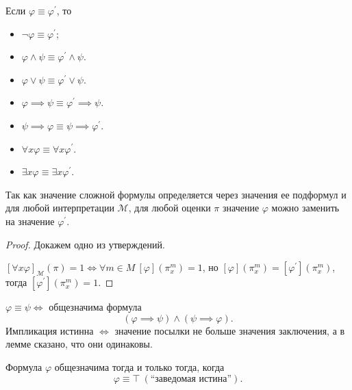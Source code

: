\documentclass[a4paper, fleqn]{article}
\begin{document}
    \begin{lemma}
        Если $\varphi \equiv \varphi^{\prime}$, то
        \begin{itemize}[topsep=0pt]
            \item $\neg \varphi \equiv \varphi^{\prime}$;
            \item $\varphi \land \psi \equiv \varphi^{\prime} \land \psi$.
            \item $\varphi \lor \psi \equiv \varphi^{\prime} \lor \psi$.
            \item $\varphi \implies \psi \equiv \varphi^{\prime} \implies \psi$.
            \item $\psi \implies \varphi \equiv \psi \implies \varphi^{\prime}$.
            \item $\forall x \varphi \equiv \forall x \varphi^{\prime}$.
            \item $\exists x \varphi \equiv \exists x \varphi^{\prime}$.
        \end{itemize}
        Так как значение сложной формулы определяется через значения ее подформул и 
        для любой интерпретации $\mathcal{M}$, для любой оценки $\pi$ значение 
        $\varphi$ можно заменить на значение $\varphi^{\prime}$.
    \end{lemma}

    \begin{proof}
        Докажем одно из утверждений. 

        $[\forall x \varphi]_{\mathcal{M}}(\pi) = 1 
        \iff \forall m \in M~[\varphi]\left( \pi_{x}^{m} \right) = 1$, 
        но $[\varphi]\left( \pi_{x}^{m} \right) = 
        [\varphi^{\prime}]\left( \pi_{x}^{m} \right)$, тогда 
        $[\varphi^{\prime}]\left( \pi_{x}^{m} \right) = 1$.
    \end{proof}

    \begin{lemma}
        $\varphi \equiv \psi \iff $ общезначима формула
        $$
            (\varphi \implies \psi) \land (\psi \implies \varphi).
        $$
        Импликация истинна $\iff$ значение посылки не больше значения заключения, 
        а в лемме сказано, что они одинаковы.
    \end{lemma}
    \begin{lemma}
        Формула $\varphi$ общезначима тогда и только тогда, когда
        $$
            \varphi \equiv \top \ (\text{``заведомая истина''}).
        $$
    \end{lemma}
\end{document}
